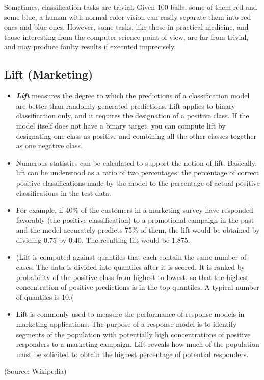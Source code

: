 \documentclass[]{report}
\begin{document}
Sometimes, classification tasks are trivial. Given 100 balls, some of them red and some blue, a human with normal color vision can easily separate them into red ones and blue ones. However, some tasks, like those in practical medicine, and those interesting from the computer science point of view, are far from trivial, and may produce faulty results if executed imprecisely.


\subsection{Lift (Marketing) }
\begin{itemize}
\item \textbf{\textit{Lift}} measures the degree to which the predictions of a classification model are better than randomly-generated predictions. Lift applies to binary classification only, and it requires the designation of a positive class. If the model itself does not have a binary target, you can compute lift by designating one class as positive and combining all the other classes together as one negative class.

\item Numerous statistics can be calculated to support the notion of lift. Basically, lift can be understood as a ratio of two percentages: the percentage of correct positive classifications made by the model to the percentage of actual positive classifications in the test data.

\item For example, if 40\% of the customers in a marketing survey have responded favorably (the positive classification) to a promotional campaign in the past and the model accurately predicts 75\% of them, the lift would be obtained by dividing 0.75 by 0.40. The resulting lift would be 1.875.

\item (Lift is computed against quantiles that each contain the same number of cases. The data is divided into quantiles after it is scored. It is ranked by probability of the positive class from highest to lowest, so that the highest concentration of positive predictions is in the top quantiles. A typical number of quantiles is 10.(

\item Lift is commonly used to measure the performance of response models in marketing applications. The purpose of a response model is to identify segments of the population with potentially high concentrations of positive responders to a marketing campaign. Lift reveals how much of the population must be solicited to obtain the highest percentage of potential responders.

\end{itemize}
(Source: Wikipedia)
\end{document}

